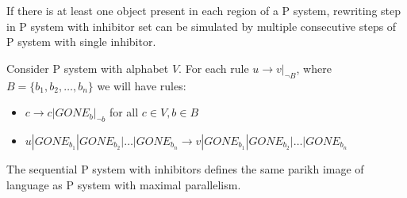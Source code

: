 \begin{lema}
\label{lemma:inhibitor_step}
  If there is at least one object present in each region of a P system, rewriting step in P system with inhibitor set can be simulated by multiple consecutive steps of P system with single inhibitor.
\end{lema}

\begin{dokaz}
  Consider P system with alphabet $V$.
  For each rule $u\rightarrow v|_{\neg B}$, where $B=\{b_1, b_2, \dots ,b_n\}$ we will have rules:
  \begin{itemize}
    \item $c \rightarrow c|GONE_{b}|_{\neg b}$ for all $ c\in V, b\in B$
    \item $u|GONE_{b_1}|GONE_{b_2}|\dots|GONE_{b_n} \rightarrow v|GONE_{b_1}|GONE_{b_2}|\dots|GONE_{b_n}$
  \end{itemize}
\end{dokaz}



\begin{veta}
  The sequential P system with inhibitors defines the same parikh image of language as P system with maximal parallelism.
\end{veta}

